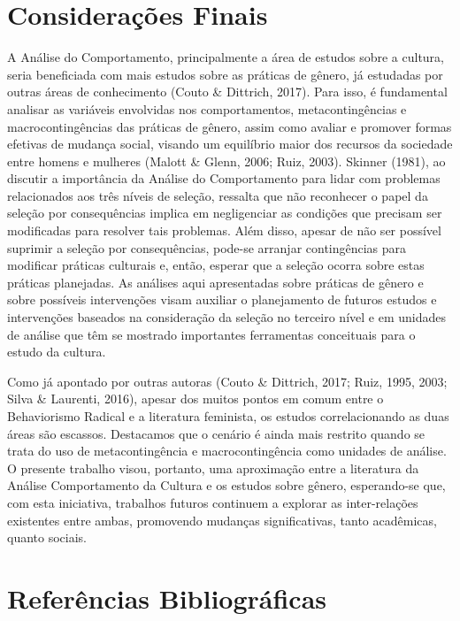 \section{Considerações Finais}

A Análise do Comportamento, principalmente a área de estudos sobre a cultura, seria beneficiada com mais estudos sobre as práticas de gênero, já estudadas por outras áreas de conhecimento (Couto \& Dittrich, 2017). Para isso, é fundamental analisar as variáveis envolvidas nos comportamentos, metacontingências e macrocontingências das práticas de gênero, assim como avaliar e promover formas efetivas de mudança social, visando um equilíbrio maior dos recursos da sociedade entre homens e mulheres (Malott \& Glenn, 2006; Ruiz, 2003). Skinner (1981), ao discutir a importância da Análise do Comportamento para lidar com problemas relacionados aos três níveis de seleção, ressalta que não reconhecer o papel da seleção por consequências implica em negligenciar as condições que precisam ser modificadas para resolver tais problemas. Além disso, apesar de não ser possível suprimir a seleção por consequências, pode-se arranjar contingências para modificar práticas culturais e, então, esperar que a seleção ocorra sobre estas práticas planejadas. As análises aqui apresentadas sobre práticas de gênero e sobre possíveis intervenções visam auxiliar o planejamento de futuros estudos e intervenções baseados na consideração da seleção no terceiro nível e em unidades de análise que têm se mostrado importantes ferramentas conceituais para o estudo da cultura.

Como já apontado por outras autoras (Couto \& Dittrich, 2017; Ruiz, 1995, 2003; Silva \& Laurenti, 2016), apesar dos muitos pontos em comum entre o Behaviorismo Radical e a literatura feminista, os estudos correlacionando as duas áreas são escassos. Destacamos que o cenário é ainda mais restrito quando se trata do uso de metacontingência e macrocontingência como unidades de análise. O presente trabalho visou, portanto, uma aproximação entre a literatura da Análise Comportamento da Cultura e os estudos sobre gênero, esperando-se que, com esta iniciativa, trabalhos futuros continuem a explorar as inter-relações existentes entre ambas, promovendo mudanças significativas, tanto acadêmicas, quanto sociais.

\section*{Referências Bibliográficas}

